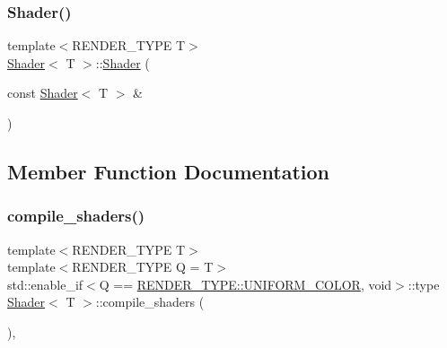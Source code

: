 \mbox{\label{classShader_a49b2a448a00b5e1413c17501f8873cca}} 
\subsubsection{\texorpdfstring{Shader()}{Shader()}\hspace{0.1cm}{\footnotesize\ttfamily [3/3]}}
{\footnotesize\ttfamily template$<$R\+E\+N\+D\+E\+R\+\_\+\+T\+Y\+PE T$>$ \\
\mbox{\hyperlink{classShader}{Shader}}$<$ T $>$\+::\mbox{\hyperlink{classShader}{Shader}} (\begin{DoxyParamCaption}\item[{const \mbox{\hyperlink{classShader}{Shader}}$<$ T $>$ \&}]{ }\end{DoxyParamCaption})\hspace{0.3cm}{\ttfamily [delete]}}



\subsection{Member Function Documentation}
\mbox{\label{classShader_a1f4179a8be4ce0b82cf7b3079fe2bee3}} 
\subsubsection{\texorpdfstring{compile\+\_\+shaders()}{compile\_shaders()}\hspace{0.1cm}{\footnotesize\ttfamily [1/2]}}
{\footnotesize\ttfamily template$<$R\+E\+N\+D\+E\+R\+\_\+\+T\+Y\+PE T$>$ \\
template$<$R\+E\+N\+D\+E\+R\+\_\+\+T\+Y\+PE Q = T$>$ \\
std\+::enable\+\_\+if$<$Q == \mbox{\hyperlink{render_8hpp_a24e288e18eb7b6e01de7565001fedb60aa98862073f71a928bad5099cc3e1c2ed}{R\+E\+N\+D\+E\+R\+\_\+\+T\+Y\+P\+E\+::\+U\+N\+I\+F\+O\+R\+M\+\_\+\+C\+O\+L\+OR}}, void$>$\+::type \mbox{\hyperlink{classShader}{Shader}}$<$ T $>$\+::compile\+\_\+shaders (\begin{DoxyParamCaption}{ }\end{DoxyParamCaption})\hspace{0.3cm}{\ttfamily [inline]}, {\ttfamily [protected]}}

